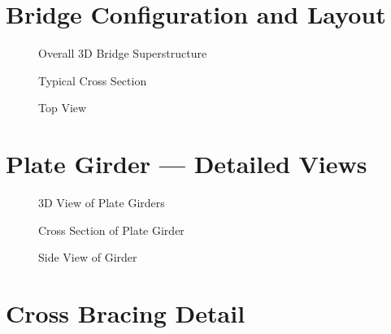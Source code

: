 \documentclass[12pt,a4paper]{report}
\numberwithin{table}{chapter}
\numberwithin{figure}{chapter}
\begin{document}
\section{Bridge Configuration and Layout}
\label{sec:bridge-layout}

\begin{figure}[H]
\centering
{}
\caption{Overall 3D Bridge Superstructure}
\label{fig:bridge-3d}
\end{figure}


\begin{figure}[H]
\centering
{}
\caption{Typical Cross Section}
\label{fig:cross-section}
\end{figure}


\begin{figure}[H]
\centering
{}
\caption{Top View}
\label{fig:top-view}
\end{figure}


\section{Plate Girder --- Detailed Views}
\label{sec:girder-views}

\begin{figure}[H]
\centering
{}
\caption{3D View of Plate Girders}
\label{fig:girder-3d}
\end{figure}


\begin{figure}[H]
\centering
{}
\caption{Cross Section of Plate Girder}
\label{fig:girder-xsec}
\end{figure}


\begin{figure}[H]
\centering
{}
\caption{Side View of Girder}
\label{fig:girder-side}
\end{figure}


\section{Cross Bracing Detail}
\label{sec:bracing-detail}
\end{document}
